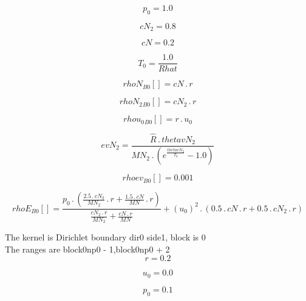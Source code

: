 \documentclass{article}
\begin{document}
\begin{dmath}p_{0} = 1.0\end{dmath}

\begin{dmath}cN_{2} = 0.8\end{dmath}

\begin{dmath}cN = 0.2\end{dmath}

\begin{dmath}T_{0} = \frac{1.0}{Rhat}\end{dmath}

\begin{dmath}{rhoN{_{B0}}}[{}] = cN \,.\, r\end{dmath}

\begin{dmath}{rhoN_{2}{_{B0}}}[{}] = cN_{2} \,.\, r\end{dmath}

\begin{dmath}{rhou_{0}{_{B0}}}[{}] = r \,.\, u_{0}\end{dmath}

\begin{dmath}evN_{2} = \frac{\hat{R} \,.\, thetavN_{2}}{MN_{2} \,.\, \left(e^{\frac{thetavN_{2}}{T_{0}}} - 1.0\right)}\end{dmath}

\begin{dmath}{rhoev{_{B0}}}[{}] = 0.001\end{dmath}

\begin{dmath}{rhoE{_{B0}}}[{}] = \frac{p_{0} \,.\, \left(\frac{2.5 \,.\, cN_{2}}{MN_{2}} \,.\, r + \frac{1.5 \,.\, cN}{MN} \,.\, r\right)}{\frac{cN_{2} \,.\, r}{MN_{2}} + \frac{cN \,.\, r}{MN}} + \left(u_{0} \right)^{2} \,.\, \left(0.5 \,.\, cN \,.\, 
r + 0.5 \,.\, cN_{2} \,.\, r\right)\end{dmath}

\noindent The kernel is Dirichlet boundary dir0 side1, block is 0\\\noindent The ranges are block0np0 - 1,block0np0 + 2\\\begin{dmath}r = 0.2\end{dmath}

\begin{dmath}u_{0} = 0.0\end{dmath}

\begin{dmath}p_{0} = 0.1\end{dmath}
\end{document}
